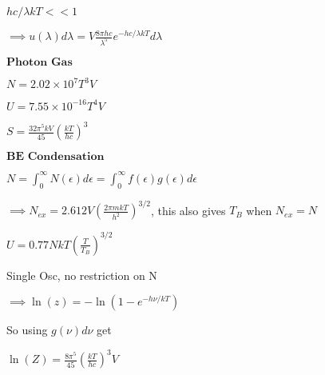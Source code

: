 \documentclass{article}
\begin{document}
\begin{multicols}{3}
$hc/\lambda kT << 1$

$\implies u(\lambda)d\lambda=V\frac{8\pi hc}{\lambda^5}e^{-hc/\lambda kT}d\lambda$

$\textbf{Photon Gas}$

$N=2.02\times 10^7 T^3 V$

$U=7.55\times 10^{-16}T^4V$

$S=\frac{32\pi^5 kV}{45}\left ( \frac{kT}{hc} \right ) ^3$

$\textbf{BE Condensation}$

$N=\int_0^\infty N(\epsilon)d\epsilon = \int_0^\infty f(\epsilon)g(\epsilon)d\epsilon$

$\implies N_{ex}=2.612 V \left ( \frac{2\pi mkT}{h^2} \right )^{3/2}$, this also gives $T_B$ when $N_{ex}=N$

$U=0.77 NkT \left ( \frac{T}{T_B}  \right )^{3/2}$

Single Osc, no restriction on N

$\implies \ln(z)=-\ln(1-e^{-h\nu / kT})$

So using $g(\nu)d\nu$ get

$\ln(Z)=\frac{8\pi^5}{45} \left ( \frac{kT}{hc} \right )^3 V$

\end{multicols}
\end{document}
